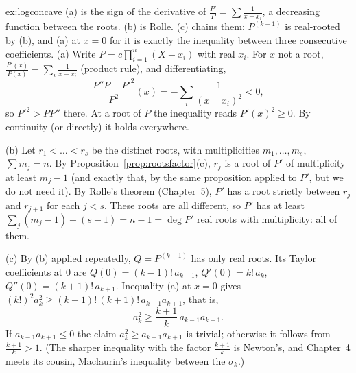 \begin{solution}{ex:logconcave}
\idea (a) is the sign of the derivative of $\frac{P'}P=\sum\frac1{x-x_i}$, a decreasing function between the roots. (b) is Rolle. (c) chains them: $P^{(k-1)}$ is real-rooted by (b), and (a) at $x=0$ for it is exactly the inequality between three consecutive coefficients.
\writeup (a) Write $P=c\prod_{i=1}^n(X-x_i)$ with real $x_i$. For $x$ not a root, $\frac{P'(x)}{P(x)}=\sum_i\frac1{x-x_i}$ (product rule), and differentiating,
\[
\frac{P''P-P'^2}{P^2}(x)=-\sum_i\frac1{(x-x_i)^2}<0,
\]
so $P'^2>PP''$ there. At a root of $P$ the inequality reads $P'(x)^2\ge0$. By continuity (or directly) it holds everywhere.

(b) Let $r_1<\dots<r_s$ be the distinct roots, with multiplicities $m_1,\dots,m_s$, $\sum m_j=n$. By Proposition~\ref{prop:rootsfactor}(c), $r_j$ is a root of $P'$ of multiplicity at least $m_j-1$ (and exactly that, by the same proposition applied to $P'$, but we do not need it). By Rolle's theorem (Chapter~5), $P'$ has a root strictly between $r_j$ and $r_{j+1}$ for each $j<s$. These roots are all different, so $P'$ has at least $\sum_j(m_j-1)+(s-1)=n-1=\deg P'$ real roots with multiplicity: all of them.

(c) By (b) applied repeatedly, $Q=P^{(k-1)}$ has only real roots. Its Taylor coefficients at $0$ are $Q(0)=(k-1)!\,a_{k-1}$, $Q'(0)=k!\,a_k$, $Q''(0)=(k+1)!\,a_{k+1}$. Inequality (a) at $x=0$ gives $(k!)^2a_k^2\ge(k-1)!\,(k+1)!\,a_{k-1}a_{k+1}$, that is,
\[
a_k^2\ge\frac{k+1}k\,a_{k-1}a_{k+1}.
\]
If $a_{k-1}a_{k+1}\le0$ the claim $a_k^2\ge a_{k-1}a_{k+1}$ is trivial; otherwise it follows from $\frac{k+1}k>1$. (The sharper inequality with the factor $\frac{k+1}k$ is Newton's, and Chapter~4 meets its cousin, Maclaurin's inequality between the $\sigma_k$.)
\end{solution}

